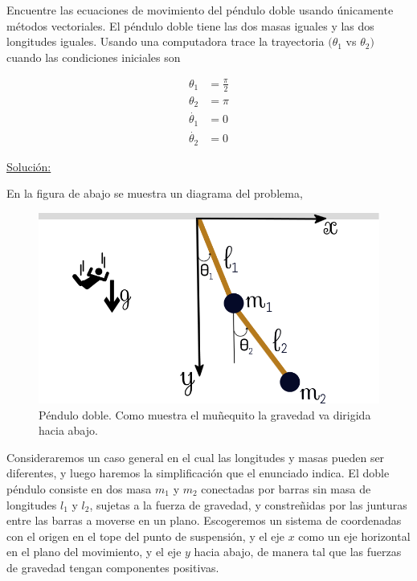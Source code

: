 \documentclass[a4paper,10pt]{article}
\numberwithin{equation}{section}
\begin{document}
Encuentre las ecuaciones de movimiento del péndulo doble usando únicamente métodos 
vectoriales. El péndulo doble tiene las dos masas iguales y las dos longitudes iguales.
Usando una computadora trace la trayectoria $(\theta_1$ vs $\theta_2)$ cuando las 
condiciones iniciales son

\begin{align*}
 \theta_1 &= \frac{\pi}{2} \\
 \theta_2 &= \pi \\
 \dot{\theta_1} &= 0 \\
 \dot{\theta_2} &= 0 
\end{align*}

\vspace{.3cm}

\underline{Solución:} \vspace{.3cm}

En la figura de abajo se muestra un diagrama del problema, 

\begin{figure}[H]
\center
\includegraphics[scale=0.4]{problema2fig1}
\caption{Péndulo doble. Como muestra el muñequito la gravedad va dirigida hacia 
abajo.}
\label{fig:problema2fig1}
\end{figure}


Consideraremos un caso general en el cual las longitudes y masas pueden ser diferentes,
y luego haremos la simplificación que el enunciado indica. El doble péndulo consiste 
en dos masa $m_1$ y $m_2$ conectadas por barras sin masa de longitudes $l_1$ y $l_2$,
sujetas a la fuerza de gravedad, y constreñidas por las junturas entre las barras
a moverse en un plano. Escogeremos un sistema de coordenadas con el origen en el 
tope del punto de suspensión, y el eje $x$ como un eje horizontal en el plano del 
movimiento, y el eje $y$ hacia abajo, de manera tal que las fuerzas de gravedad 
tengan componentes positivas.
\end{document}

